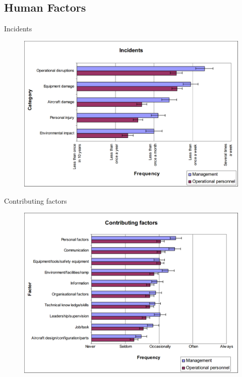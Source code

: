 \subsection{Human Factors}

\begin{frame}{Incidents}{}
	\begin{figure}[H]
	\centering
	\includegraphics[width=\textwidth]{Grafik/FrequencyOfIncidents}
\end{figure}
\end{frame}

\begin{frame}{Contributing factors}{}
	\begin{figure}[H]
	\centering
	\includegraphics[width=\textwidth]{Grafik/ContributingFactors}
\end{figure}
\end{frame}

